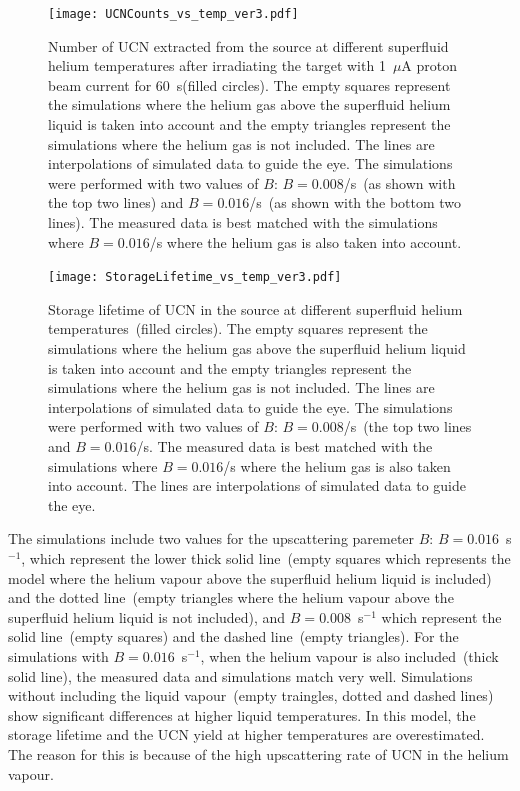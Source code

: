 \begin{figure}[h!]
  \centering
  \texttt{[image: UCNCounts\_vs\_temp\_ver3.pdf]}
  \caption{Number of UCN extracted from the source at different
    superfluid helium temperatures after irradiating the target with
    1~$\mu$A proton beam current for 60~s(filled circles). The empty
    squares represent the simulations where the helium gas above the
    superfluid helium liquid is taken into account and the empty
    triangles represent the simulations where the helium gas is not
    included. The lines are interpolations of simulated data to guide
    the eye. The simulations were performed with two values of $B$:
    $B = 0.008$/s~(as shown with the top two lines) and
    $B = 0.016$/s~(as shown with the bottom two lines). The measured
    data is best matched with the simulations where $B = 0.016$/s
    where the helium gas is also taken into account.}
  \label{fig:Counts_vs_temp_sim}
\end{figure}

\begin{figure}[h!]
  \centering
  \texttt{[image: StorageLifetime\_vs\_temp\_ver3.pdf]}
  \caption{Storage lifetime of UCN in the source at different
    superfluid helium temperatures~(filled circles).  The empty
    squares represent the simulations where the helium gas above the
    superfluid helium liquid is taken into account and the empty
    triangles represent the simulations where the helium gas is not
    included. The lines are interpolations of simulated data to guide
    the eye. The simulations were performed with two values of $B$:
    $B = 0.008$/s~(the top two lines and $B = 0.016$/s. The measured
    data is best matched with the simulations where $B = 0.016$/s
    where the helium gas is also taken into account.  The lines are
    interpolations of simulated data to guide the eye.}
  \label{fig:storage_vs_temp_sim}
\end{figure}

The simulations include two values for the upscattering paremeter $B$:
$B= 0.016$~s$^{-1}$, which represent the lower thick solid line~(empty
squares which represents the model where the helium vapour above the
superfluid helium liquid is included) and the dotted line~(empty
triangles where the helium vapour above the superfluid helium liquid
is not included), and $B= 0.008$~s$^{-1}$ which represent the solid
line~(empty squares) and the dashed line~(empty triangles). For the
simulations with $B= 0.016$~s$^{-1}$, when the helium vapour is also
included~(thick solid line), the measured data and simulations match
very well. Simulations without including the liquid vapour~(empty
traingles, dotted and dashed lines) show significant differences at higher liquid
temperatures. In this model, the storage lifetime and the UCN yield at
higher temperatures are overestimated. The reason for this is because
of the high upscattering rate of UCN in the helium vapour.



